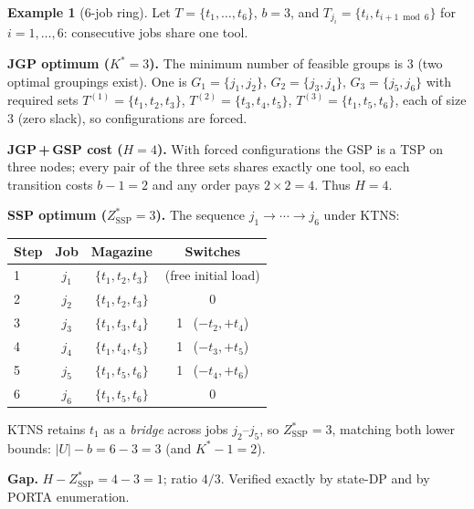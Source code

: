 \documentclass[11pt,a4paper]{article}
\theoremstyle{plain}
\theoremstyle{definition}
\newtheorem{example}[theorem]{Example}
\newcommand{\Kstar}{K^{*}}
\newcommand{\ZSSP}{Z_{\mathrm{SSP}}^{*}}
\begin{document}
\begin{example}[$6$-job ring]
\label{ex:ring}
Let $T=\{t_1,\dots,t_6\}$, $b=3$, and
$T_{j_i}=\{t_i,t_{i+1\bmod 6}\}$ for $i=1,\dots,6$: consecutive jobs share one tool.

\smallskip\noindent\textbf{JGP optimum ($\Kstar=3$).} The minimum number of feasible
groups is $3$ (two optimal groupings exist). One is
$G_1=\{j_1,j_2\},\,G_2=\{j_3,j_4\},\,G_3=\{j_5,j_6\}$ with required sets
$T^{(1)}=\{t_1,t_2,t_3\}$, $T^{(2)}=\{t_3,t_4,t_5\}$, $T^{(3)}=\{t_1,t_5,t_6\}$, each of
size $3$ (zero slack), so configurations are forced.

\smallskip\noindent\textbf{JGP\,+\,GSP cost ($H=4$).} With forced configurations the GSP
is a TSP on three nodes; every pair of the three sets shares exactly one tool, so each
transition costs $b-1=2$ and any order pays $2\times2=4$. Thus $H=4$.

\smallskip\noindent\textbf{SSP optimum ($\ZSSP=3$).} The sequence
$j_1\to\cdots\to j_6$ under KTNS:
\begin{center}
\begin{tabular}{lccc}
\toprule
Step & Job & Magazine & Switches \\
\midrule
1 & $j_1$ & $\{t_1,t_2,t_3\}$ & (free initial load) \\
2 & $j_2$ & $\{t_1,t_2,t_3\}$ & 0 \\
3 & $j_3$ & $\{t_1,t_3,t_4\}$ & 1 \ ($-t_2,+t_4$) \\
4 & $j_4$ & $\{t_1,t_4,t_5\}$ & 1 \ ($-t_3,+t_5$) \\
5 & $j_5$ & $\{t_1,t_5,t_6\}$ & 1 \ ($-t_4,+t_6$) \\
6 & $j_6$ & $\{t_1,t_5,t_6\}$ & 0 \\
\bottomrule
\end{tabular}
\end{center}
KTNS retains $t_1$ as a \emph{bridge} across jobs $j_2$--$j_5$, so $\ZSSP=3$, matching
both lower bounds: $|U|-b=6-3=3$ (and $\Kstar-1=2$).

\smallskip\noindent\textbf{Gap.} $H-\ZSSP=4-3=1$; ratio $4/3$. Verified exactly by
state-DP and by PORTA enumeration.
\end{example}
\end{document}
